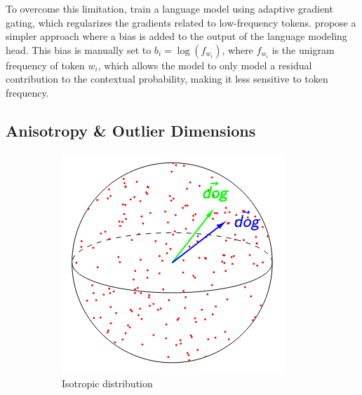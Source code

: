 To overcome this limitation, \citet{yu-etal-2022-rare} train a language model using adaptive gradient gating, which regularizes the gradients related to low-frequency tokens. \citet{meister-etal-2023-natural} propose a simpler approach where a bias is added to the output of the language modeling head. This bias is manually set to $b_i = \log(f_{w_i})$, where $f_{w_i}$ is the unigram frequency of token $w_i$, which allows the model to only model a residual contribution to the contextual probability, making it less sensitive to token frequency.

\subsection{Anisotropy \& Outlier Dimensions}
\label{ssec:rw_aniso}


\begin{figure}[ht]
    \centering
    \begin{subfigure}[b]{0.3\textwidth}
        \includegraphics[width=\textwidth]{sources/related_works/imgs/anisotropy_kawin.png}
        \caption{Isotropic distribution}
        \label{fig:iso}
    \end{subfigure}
    \begin{subfigure}[b]{0.3\textwidth}

\end{subfigure}
\end{figure}
